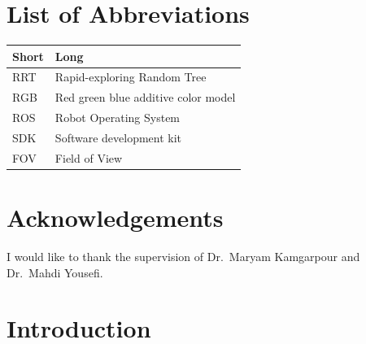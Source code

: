 \documentclass[
  oneside]{ubcthesis}
\begin{document}
{
\setcounter{tocdepth}{2}
\tableofcontents
}
\hypertarget{list-of-abbreviations}{%
\chapter{List of Abbreviations}\label{list-of-abbreviations}}

\begin{longtable}{ll}
\toprule
Short & Long\\
\midrule
RRT & Rapid-exploring Random Tree\\
RGB & Red green blue additive color model\\
ROS & Robot Operating System\\
SDK & Software development kit\\
FOV & Field of View\\
\bottomrule
\end{longtable}

\hypertarget{acknowledgements}{%
\chapter{Acknowledgements}\label{acknowledgements}}

I would like to thank the supervision of Dr.~Maryam Kamgarpour and Dr.~Mahdi Yousefi.

\mainmatter

\hypertarget{introduction}{%
\chapter{Introduction}\label{introduction}}
\end{document}
